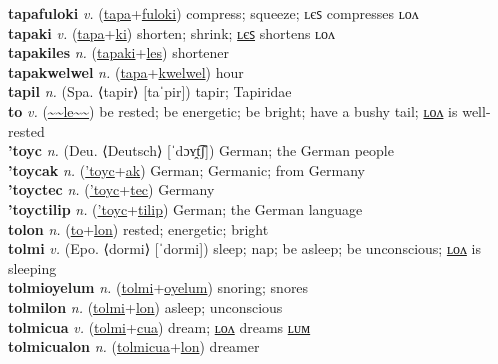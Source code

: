 \textbf{tapafuloki} \textit{v.} (\hyperref[tapa]{tapa}+\hyperref[fuloki]{fuloki})
compress; squeeze; ʟєꜱ compresses ʟᴏᴧ \label{tapafuloki} \\
\textbf{tapaki} \textit{v.} (\hyperref[tapa]{tapa}+\hyperref[ki]{ki})
shorten; shrink; \hyperref[tapakiles]{ʟєꜱ} shortens ʟᴏᴧ \label{tapaki} \\
\textbf{tapakiles} \textit{n.} (\hyperref[tapaki]{tapaki}+\hyperref[les]{les})
shortener \label{tapakiles} \\
\textbf{tapakwelwel} \textit{n.} (\hyperref[tapa]{tapa}+\hyperref[kwelwel]{kwelwel})
hour \label{tapakwelwel} \\
\textbf{tapil} \textit{n.} (Spa. ⟨tapir⟩ [taˈpir])
tapir; Tapiridae \label{tapil} \\
\textbf{to} \textit{v.} (\hyperref[le]{\~{}\~{}le\~{}\~{}})
be rested; be energetic; be bright; have a bushy tail; \hyperref[tolon]{ʟᴏᴧ} is well-rested \label{to} \\
\textbf{'toyc} \textit{n.} (Deu. ⟨Deutsch⟩ [ˈdɔʏ̯t͡ʃ])
German; the German people \label{'toyc} \\
\textbf{'toycak} \textit{n.} (\hyperref['toyc]{'toyc}+\hyperref[ak]{ak})
German; Germanic; from Germany \label{'toycak} \\
\textbf{'toyctec} \textit{n.} (\hyperref['toyc]{'toyc}+\hyperref[tec]{tec})
Germany \label{'toyctec} \\
\textbf{'toyctilip} \textit{n.} (\hyperref['toyc]{'toyc}+\hyperref[tilip]{tilip})
German; the German language \label{'toyctilip} \\
\textbf{tolon} \textit{n.} (\hyperref[to]{to}+\hyperref[lon]{lon})
rested; energetic; bright \label{tolon} \\
\textbf{tolmi} \textit{v.} (Epo. ⟨dormi⟩ [ˈdormi])
sleep; nap; be asleep; be unconscious; \hyperref[tolmilon]{ʟᴏᴧ} is sleeping \label{tolmi} \\
\textbf{tolmioyelum} \textit{n.} (\hyperref[tolmi]{tolmi}+\hyperref[oyelum]{oyelum})
snoring; snores \label{tolmioyelum} \\
\textbf{tolmilon} \textit{n.} (\hyperref[tolmi]{tolmi}+\hyperref[lon]{lon})
asleep; unconscious \label{tolmilon} \\
\textbf{tolmicua} \textit{v.} (\hyperref[tolmi]{tolmi}+\hyperref[cua]{cua})
dream; \hyperref[tolmicualon]{ʟᴏᴧ} dreams \hyperref[tolmicualum]{ʟᴜᴍ} \label{tolmicua} \\
\textbf{tolmicualon} \textit{n.} (\hyperref[tolmicua]{tolmicua}+\hyperref[lon]{lon})
dreamer \label{tolmicualon} \\
